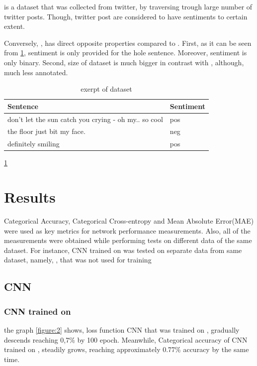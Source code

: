 \documentclass[conference]{IEEEtran}
\begin{document}
			\TW\cite{dataset:TW} is a dataset that was collected from twitter, by traversing trough large number of twitter posts. Though, twitter post are considered to have sentiments to certain extent.
			
			Conversely, \TW\cite{dataset:TW}, has direct opposite properties compared to \RT\cite{dataset:RT}. First, as it can be seen from  \ref{table:2}, sentiment is only provided for the hole sentence. Moreover, sentiment is only binary. Second, size of \TW\cite{dataset:TW} dataset is much bigger in contrast with \RT\cite{dataset:RT}, although, much less annotated.
			
		
			\begin{table}
				\centering
				\begin{tabular}{| m{6cm} | m{1cm} | } 
					\hline
					Sentence & Sentiment\\
					\hline
					don't let the sun catch you crying - oh my.. so cool & pos \\ 
					\hline
					the floor just bit my face. & neg \\
					\hline
					definitely smiling & pos \\
					\hline
				\end{tabular}
				\caption{exerpt of dataset \TW}
				\label{table:2}
				\ref{table:2}
			\end{table}

\section{Results}\label{AA}

Categorical Accuracy, Categorical Cross-entropy and Mean Absolute Error(MAE) were used as key metrics for network performance measurements. Also, all of the measurements were obtained while performing tests on different data of the same dataset. For instance, CNN trained on \RT was tested on separate data from same dataset, namely, \RT, that was not used for training 

	\subsection{CNN}
	
		\subsubsection{CNN trained on \RT}
		
			the graph \ref{figure:2} shows, loss function CNN that was trained on \RT, gradually descends reaching 0,7\% by 100 epoch. Meanwhile, Categorical accuracy of  CNN trained on \RT, steadily grows, reaching approximately 0.77\% accuracy by the same time.
			
\end{document}
